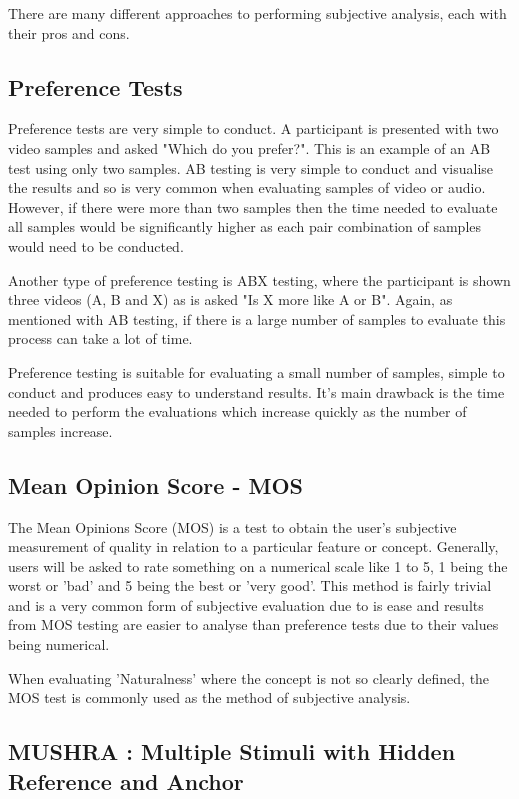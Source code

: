 \documentclass[bsc,frontabs,twoside,singlespacing,parskip]{infthesis}
\begin{document}
There are many different approaches to performing subjective analysis, each with their pros and cons. 

\subsection{Preference Tests}

Preference tests are very simple to conduct. A participant is presented with two video samples and asked "Which do you prefer?". This is an example of an AB test using only two samples. AB testing is very simple to conduct and visualise the results and so is very common when evaluating samples of video or audio. However, if there were more than two samples then the time needed to evaluate all samples would be significantly higher as each pair combination of samples would need to be conducted.

Another type of preference testing is ABX testing,  where the participant is shown three videos (A, B and X) as is asked "Is X more like A or B". Again, as mentioned with AB testing, if there is a large number of samples to evaluate this process can take a lot of time.

Preference testing is suitable for evaluating a small number of samples, simple to conduct and produces easy to understand results. It's main drawback is the time needed to perform the evaluations which increase quickly as the number of samples increase.

\subsection{Mean Opinion Score - MOS}

The Mean Opinions Score (MOS) is a test to obtain the user's subjective measurement of quality in relation to a particular feature or concept. Generally, users will be asked to rate something on a numerical scale like 1 to 5, 1 being the worst or 'bad' and 5 being the best or 'very good'. This method is fairly trivial and is a very common form of subjective evaluation due to is ease and results from MOS testing are easier to analyse than preference tests due to their values being numerical.

When evaluating 'Naturalness' where the concept is not so clearly defined, the MOS test is commonly used as the method of subjective analysis. \cite{mos}

\subsection{MUSHRA : Multiple Stimuli with Hidden Reference and Anchor}
\end{document}
